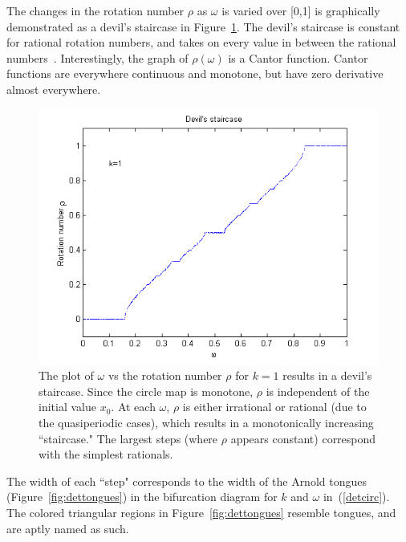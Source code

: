 The changes in the rotation number $\rho$ as $\omega$ is
varied over [0,1] is graphically demonstrated as a devil's staircase
in Figure~\ref{fig:devil_det}. The devil's staircase is constant for
rational rotation numbers, and takes on every value in between the
rational numbers~\cite{devaney}. Interestingly, the graph of $\rho(\omega)$ is a Cantor
function. Cantor functions are everywhere continuous and monotone, but have zero
derivative almost everywhere. 
\begin{figure}[!h]
\caption[The devil's staircase for the deterministic circle map]{The
  plot of $\omega$ vs the rotation number $\rho$ for $k=1$ results in a devil's
  staircase. Since the circle map is monotone, $\rho$ is independent of
  the initial value $x_0$. At each $\omega$, $\rho$ is either
  irrational or rational (due to the quasiperiodic cases), which results in a monotonically increasing  ``staircase." The largest steps (where $\rho$ appears constant)
  correspond with the simplest rationals.}\label{fig:devil_det}
	\begin{center}
		\includegraphics[scale=0.7]{figs/devil_nonrandom_k1.png}
	\end{center}
\end{figure}
The width of each ``step" corresponds to the width of the Arnold
tongues (Figure~\ref{fig:dettongues}) in the bifurcation diagram for
$k$ and $\omega$ in~(\ref{detcirc}). The colored
triangular regions in Figure~\ref{fig:dettongues} resemble tongues,
and are aptly named as such.
